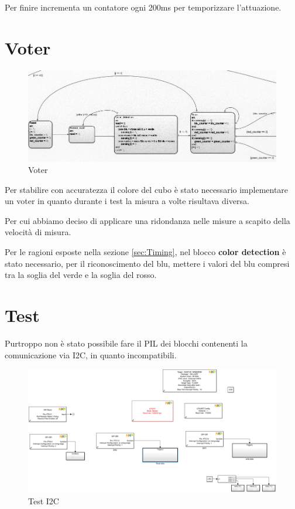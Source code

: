 \documentclass[12pt]{report}
\begin{document}
Per finire incrementa un contatore ogni 200ms per temporizzare l'attuazione.

\section{Voter}

\begin{figure}
    \includegraphics[width=\textwidth]{Immagini_sensore/voter.png}
    \caption{Voter}
\end{figure}

Per stabilire con accuratezza il colore del cubo è stato necessario implementare un voter in quanto durante i test la misura a volte risultava diversa.

Per cui abbiamo deciso di applicare una ridondanza nelle misure a scapito della velocità di misura.

Per le ragioni esposte nella sezione \ref{sec:Timing}, nel blocco \textbf{color detection} è stato necessario, per il riconoscimento del blu, mettere i valori del blu compresi tra la soglia del verde e la soglia del rosso.

\section{Test}

Purtroppo non è stato possibile fare il PIL dei blocchi contenenti la comunicazione via I2C, in quanto incompatibili.

\begin{figure}
    \includegraphics[width=\textwidth]{Immagini_sensore/i2c_test.png}
    \caption{Test I2C}
\end{figure}
\end{document}
